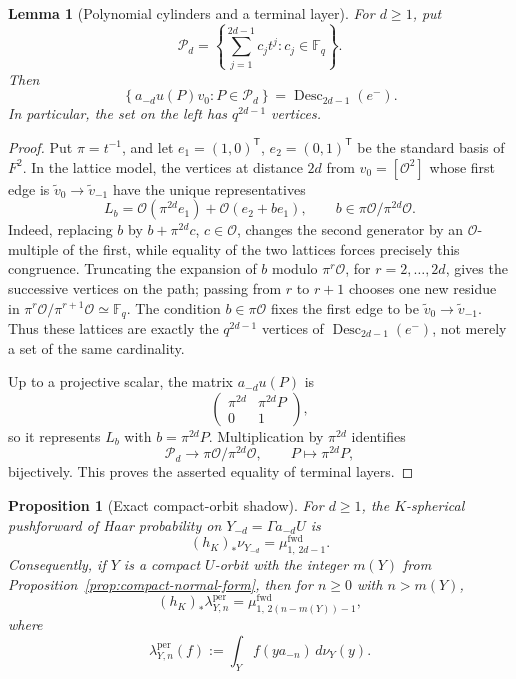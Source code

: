 \documentclass[11pt]{amsart}
\theoremstyle{definition}
\theoremstyle{plain}
\newtheorem{lemma}[definition]{Lemma}
\newtheorem{proposition}[definition]{Proposition}
\newcommand{\Fq}{\mathbb F_q}
\newcommand{\cO}{\mathcal O}
\newcommand{\fwd}{\mathrm{fwd}}
\newcommand{\Desc}{\operatorname{Desc}}
\begin{document}
\begin{lemma}[Polynomial cylinders and a terminal layer]
\label{lem:standard-compact-shadow}
For \(d\ge1\), put
\[
\mathcal P_d=
 \left\{\sum_{j=1}^{2d-1}c_jt^j:c_j\in\Fq\right\}.
\]
Then
\[
\left\{a_{-d}u(P)v_0:P\in\mathcal P_d\right\}
   =\Desc_{2d-1}(e^-).
\]
In particular, the set on the left has \(q^{2d-1}\) vertices.
\end{lemma}

\begin{proof}
Put \(\pi=t^{-1}\), and let
\(e_1=(1,0)^{\mathsf T}\), \(e_2=(0,1)^{\mathsf T}\) be the standard basis of
\(F^2\).  In the lattice model, the vertices at distance \(2d\)
from \(v_0=[\cO^2]\) whose first edge is
\(\widetilde v_0\to\widetilde v_{-1}\) have the unique representatives
\[
L_b=\cO(\pi^{2d}e_1)+\cO(e_2+be_1),
\qquad b\in\pi\cO/\pi^{2d}\cO.
\]
Indeed, replacing \(b\) by \(b+\pi^{2d}c\), \(c\in\cO\), changes the second
generator by an \(\cO\)-multiple of the first, while equality of the two
lattices forces precisely this congruence.  Truncating the expansion of \(b\)
modulo \(\pi^r\cO\), for \(r=2,\ldots,2d\), gives the successive vertices on
the path; passing from \(r\) to \(r+1\) chooses one new residue in
\(\pi^r\cO/\pi^{r+1}\cO\simeq\Fq\).  The condition \(b\in\pi\cO\) fixes the
first edge to be \(\widetilde v_0\to\widetilde v_{-1}\).  Thus these lattices
are exactly the \(q^{2d-1}\) vertices of \(\Desc_{2d-1}(e^-)\), not merely a
set of the same cardinality.

Up to a projective scalar, the matrix \(a_{-d}u(P)\) is
\[
\begin{pmatrix}\pi^{2d}&\pi^{2d}P\\0&1\end{pmatrix},
\]
so it represents \(L_b\) with \(b=\pi^{2d}P\).  Multiplication by
\(\pi^{2d}\) identifies
\[
\mathcal P_d
 \longrightarrow \pi\cO/\pi^{2d}\cO,
\qquad P\longmapsto\pi^{2d}P,
\]
bijectively.  This proves the asserted equality of terminal layers.
\end{proof}

\begin{proposition}[Exact compact-orbit shadow]
\label{prop:compact-shadow}
For \(d\ge1\), the \(K\)-spherical pushforward of Haar probability on
\(Y_{-d}=\Gamma a_{-d}U\) is
\[
(h_K)_*\nu_{Y_{-d}}=\mu^{\fwd}_{1,\,2d-1}.
\]
Consequently, if \(Y\) is a compact \(U\)-orbit with the integer \(m(Y)\) from
Proposition~\ref{prop:compact-normal-form}, then for
\(n\ge0\) with \(n>m(Y)\),
\begin{equation}\label{eq:compact-exact-shadow}
(h_K)_*\lambda_{Y,n}^{\mathrm{per}}
 =\mu^{\fwd}_{1,\,2(n-m(Y))-1},
\end{equation}
where
\[
\lambda_{Y,n}^{\mathrm{per}}(f)
   :=\int_Y f(ya_{-n})\,d\nu_Y(y).
\]
\end{proposition}
\end{document}
